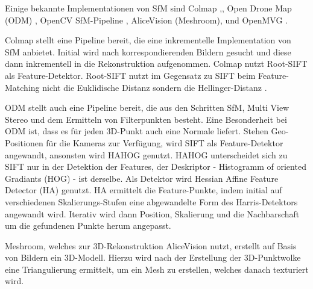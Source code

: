 \documentclass[12pt,titlepage, twoside]{article}
\begin{document}


Einige bekannte Implementationen von SfM sind Colmap \cite{schoenberger2016sfm},\cite{schoenberger2016mvs}, Open Drone Map (ODM) \cite{ODM}, OpenCV SfM-Pipeline \cite{opencv}, AliceVision (Meshroom)\cite{Moulon2012},\cite{Jancosek2011} und OpenMVG \cite{moulon2016openmvg}.

Colmap stellt eine Pipeline bereit, die eine inkrementelle Implementation von SfM anbietet. Initial wird nach korrespondierenden Bildern gesucht und diese dann inkrementell in die Rekonstruktion aufgenommen.
Colmap nutzt Root-SIFT als Feature-Detektor. Root-SIFT nutzt im Gegensatz zu SIFT beim Feature-Matching nicht die Euklidische Distanz sondern die Hellinger-Distanz \cite{arandjelovic2012three}.

ODM stellt auch eine Pipeline bereit, die aus den Schritten SfM, Multi View Stereo und dem Ermitteln von Filterpunkten besteht. 
Eine Besonderheit bei ODM ist, dass es für jeden 3D-Punkt auch eine Normale liefert. 
Stehen Geo-Positionen für die Kameras zur Verfügung, wird SIFT als Feature-Detektor angewandt, ansonsten wird HAHOG genutzt.
HAHOG unterscheidet sich zu SIFT nur in der Detektion der Features, der Deskriptor - Histogramm of oriented Gradiants (HOG) - ist derselbe. 
Als Detektor wird Hessian Affine Feature Detector (HA) \cite{mikolajczyk2002affine} genutzt. 
HA ermittelt die Feature-Punkte, indem initial auf verschiedenen Skalierungs-Stufen eine abgewandelte Form des Harris-Detektors angewandt wird. 
Iterativ wird dann Position, Skalierung und die Nachbarschaft um die gefundenen Punkte herum angepasst.

Meshroom, welches zur 3D-Rekonstruktion AliceVision nutzt, erstellt auf Basis von Bildern ein 3D-Modell. 
Hierzu wird nach der Erstellung der 3D-Punktwolke eine Triangulierung ermittelt, um ein Mesh zu erstellen, welches danach texturiert wird.
\end{document}
